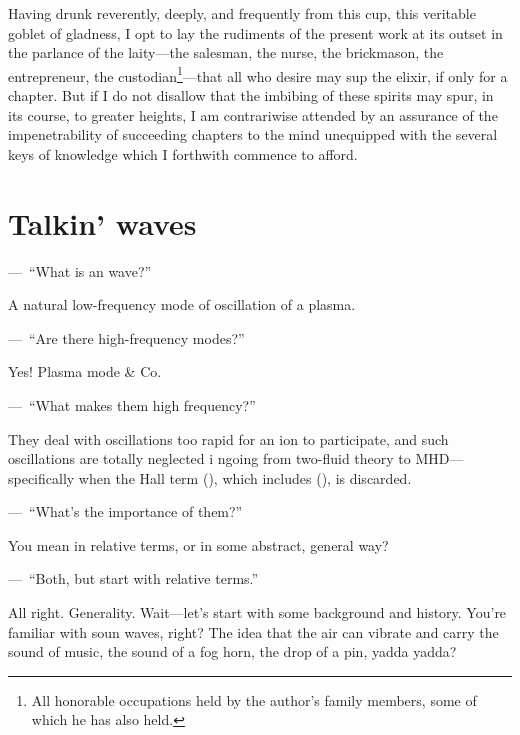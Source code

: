 Having drunk reverently, deeply, and frequently from this cup, this
veritable goblet of gladness, I opt to lay the rudiments of the
present work at its outset in the parlance of the laity---the
salesman, the nurse, the brickmason, the entrepreneur, the
custodian\footnote{All honorable occupations held by the author's
  family members, some of which he has also held.}---that all who
desire may sup the elixir, if only for a chapter. But if I do not
disallow that the imbibing of these spirits may spur, in its course,
to greater heights, I am contrariwise attended by an assurance of the
impenetrability of succeeding chapters to the mind unequipped with the
several keys of knowledge which I forthwith commence to afford.

\section{Talkin' waves}

\newlength{\savedparindent}
\newlength{\savedparskip}
\setlength{\savedparindent}{\parindent}
\setlength{\savedparskip}{\parskip}

\setlength\parindent{0pt}
\setlength\parskip{1ex plus 2pt minus 1pt}
\newcommand\X{\par\noindent---~}

\X ``What is an \Alf wave?''  

A natural low-frequency mode of
oscillation of a plasma.

\X ``Are there high-frequency modes?''  

Yes! Plasma mode \& Co.

\X ``What makes them high frequency?''


They deal with oscillations too rapid for an ion to participate,
and such oscillations are totally neglected i ngoing from two-fluid
theory to MHD---specifically when the Hall term (), which includes (),
is discarded.

\X ``What's the importance of them?''  

You mean in relative terms, or in some abstract, general way?

\X ``Both, but start with relative terms.''

All right. Generality. Wait---let's
start with some background and history. You're familiar with soun
waves, right? The idea that the air can vibrate and carry the sound of
music, the sound of a fog horn, the drop of a pin, yadda yadda?

